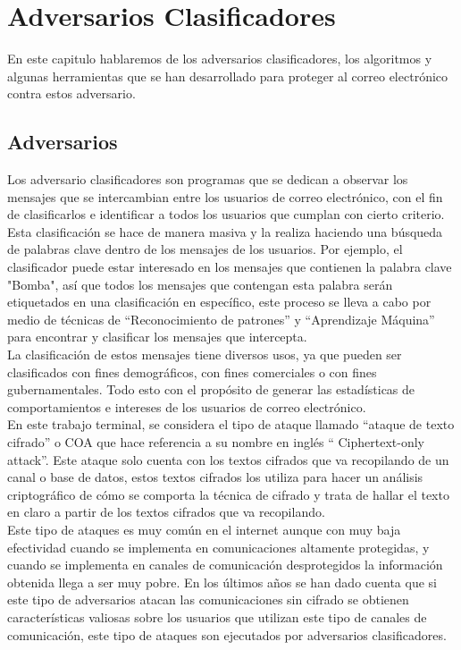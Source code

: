 \chapter{Adversarios Clasificadores}

En este capitulo hablaremos de los adversarios clasificadores, los algoritmos y algunas herramientas que se han desarrollado para proteger al correo electrónico contra estos adversario.

\section{Adversarios}

Los adversario clasificadores son programas que se dedican a observar los mensajes que se intercambian  entre  los  usuarios  de  correo  electrónico,  con  el  fin  de  clasificarlos  e 
identificar  a  todos  los  usuarios  que  cumplan  con  cierto  criterio.  Esta  clasificación  se hace de manera masiva y la realiza haciendo una búsqueda de palabras clave dentro de 
los  mensajes de  los usuarios. Por ejemplo, el  clasificador puede estar interesado en  los mensajes  que  contienen  la  palabra  clave  "Bomba",  así  que 
todos  los  mensajes  que contengan esta palabra serán etiquetados en una clasificación en específico, este proceso se lleva a cabo por medio de técnicas de 
“Reconocimiento de patrones” y “Aprendizaje Máquina” para encontrar y clasificar los mensajes que intercepta.\cite{clas,Attacks}
\\
La  clasificación  de  estos  mensajes  tiene  diversos  usos, ya  que  pueden  ser  clasificados con  fines demográficos, con  fines comerciales o con  fines gubernamentales. Todo esto 
con  el  propósito  de  generar  las  estadísticas  de  comportamientos  e  intereses  de  los usuarios de correo electrónico. \\




En este trabajo terminal, se considera el tipo de ataque llamado “ataque  de  texto  cifrado” o COA  que  hace  referencia  a  su  nombre  en  inglés “
Ciphertext-only  attack”\cite{Ciphertextonly}.  Este ataque  solo  cuenta  con  los  textos  cifrados  que  va  recopilando  de  un  canal  o  base  de 
datos,  estos  textos  cifrados  los  utiliza  para  hacer  un  análisis  criptográfico  de  cómo  se comporta la técnica de cifrado  y trata de hallar el texto en claro a partir de los textos cifrados que va recopilando. 
\\
Este  tipo  de  ataques  es  muy  común  en  el  internet  aunque  con  muy  baja  efectividad cuando   se   implementa   en   comunicaciones   altamente   protegidas,   y   cuando   se 
implementa en canales de comunicación desprotegidos  la  información obtenida  llega  a ser  muy  pobre.  En  los  últimos  años  se  han  dado  cuenta  que  si   este  tipo  de 
adversarios   atacan las  comunicaciones  sin  cifrado se  obtienen  características  valiosas  sobre  los usuarios  que  utilizan  este  tipo  de  canales  de  comunicación,  este  tipo  de  ataques  son 
ejecutados por  adversarios clasificadores.\\



